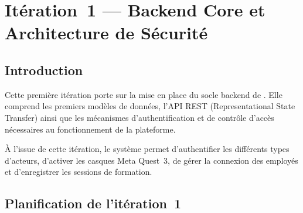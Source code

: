 %

\chapter{Itération~1 --- Backend Core et Architecture de Sécurité}

\section{Introduction}

Cette première itération porte sur la mise en place du socle backend de \tynassit{}.
Elle comprend les premiers modèles de données, l'API REST  (Representational State Transfer) ainsi que les mécanismes
d'authentification et de contrôle d'accès nécessaires au fonctionnement de la plateforme.

À l'issue de cette itération, le système permet d'authentifier les différents types
d'acteurs, d'activer les casques Meta Quest~3,
de gérer la connexion des employés et d'enregistrer les sessions de formation.

\section{Planification de l'itération~1}

